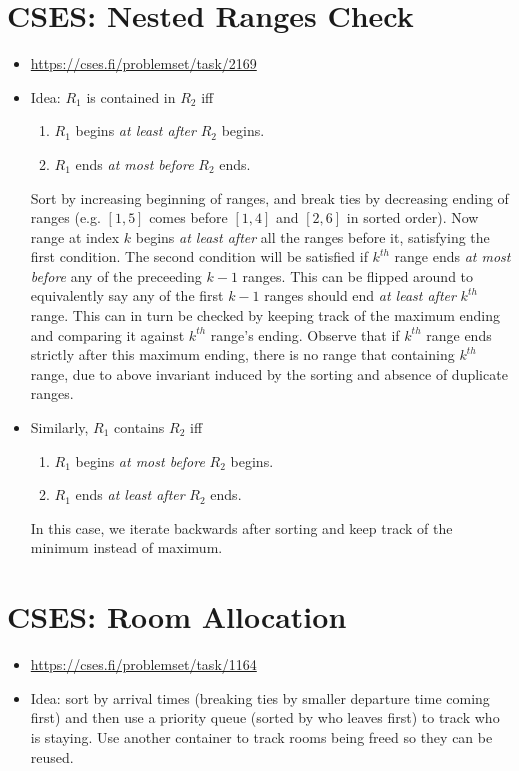 \documentclass[titlepage, 12pt]{book}
\begin{document}
\section{CSES: Nested Ranges Check}
\begin{itemize}
    \item \url{https://cses.fi/problemset/task/2169}
    \item Idea: $R_1$ is contained in $R_2$ iff
        \begin{enumerate}
            \item $R_1$ begins \textit{at least after} $R_2$ begins.
            \item $R_1$ ends \textit{at most before} $R_2$ ends.
        \end{enumerate}
        Sort by increasing beginning of ranges, and break ties by decreasing
        ending of ranges (e.g. $[1, 5]$ comes before $[1, 4]$ and $[2, 6]$ in
        sorted order). Now range at index $k$ begins \textit{at least after} all
        the ranges before it, satisfying the first condition. The second
        condition will be satisfied if $k^{th}$ range ends \textit{at most
        before} any of the preceeding $k-1$ ranges. This can be flipped around
        to equivalently say any of the first $k - 1$ ranges should end
        \textit{at least after} $k^{th}$ range. This can in turn be checked by
        keeping track of the maximum ending and comparing it against $k^{th}$
        range's ending. Observe that if $k^{th}$ range ends strictly after this
        maximum ending, there is no range that containing $k^{th}$ range, due to
        above invariant induced by the sorting and absence of duplicate ranges.
    \item Similarly, $R_1$ contains $R_2$ iff
        \begin{enumerate}
            \item $R_1$ begins \textit{at most before} $R_2$ begins.
            \item $R_1$ ends \textit{at least after} $R_2$ ends.
        \end{enumerate}
        In this case, we iterate backwards after sorting and keep track of the
        minimum instead of maximum.
\end{itemize}

\section{CSES: Room Allocation}
\begin{itemize}
    \item \url{https://cses.fi/problemset/task/1164}
    \item Idea: sort by arrival times (breaking ties by smaller departure time
        coming first) and then use a priority queue (sorted by who leaves first)
        to track who is staying. Use another container to track rooms being
        freed so they can be reused.
\end{itemize}
\end{document}
